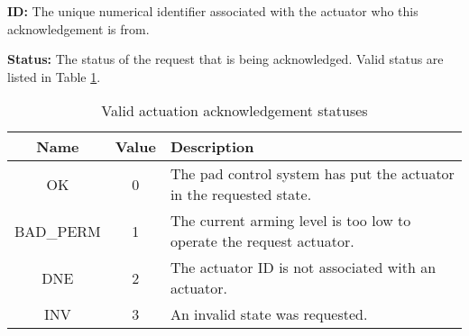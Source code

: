 \textbf{ID:} The unique numerical identifier associated with the actuator who this acknowledgement is from.

\textbf{Status:} The status of the request that is being acknowledged. Valid status are listed in Table
\ref{tbl:actuation-statuses}.

\begin{table}
    \centering
    \begin{tabular}{| c | c | p{4in} |}
        \hline
        \textbf{Name} & \textbf{Value} & \textbf{Description}                                                 \\
        \hline
        OK            & 0              & The pad control system has put the actuator in the requested state.  \\
        \hline
        BAD\_PERM     & 1              & The current arming level is too low to operate the request actuator. \\
        \hline
        DNE           & 2              & The actuator ID is not associated with an actuator.                  \\
        \hline
        INV           & 3              & An invalid state was requested.                                      \\
        \hline
    \end{tabular}
    \caption{Valid actuation acknowledgement statuses}
    \label{tbl:actuation-statuses}
\end{table}
